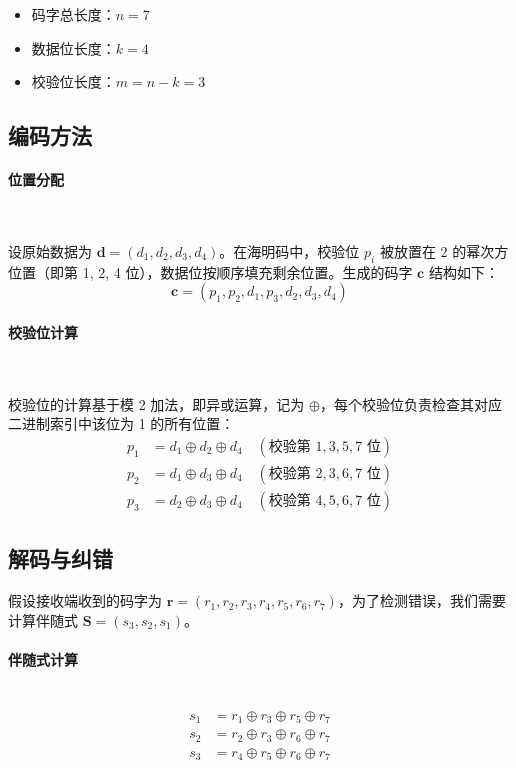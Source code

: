 \documentclass{article}
\begin{document}
\begin{itemize}
    \item 码字总长度：$n = 7$
    \item 数据位长度：$k = 4$
    \item 校验位长度：$m = n - k = 3$
\end{itemize}



\subsection{编码方法}
\paragraph*{位置分配}~{}

设原始数据为 $\mathbf{d} = (d_1, d_2, d_3, d_4)$。在海明码中，校验位 $p_i$ 被放置在 $2$ 的幂次方位置（即第 1, 2, 4 位），数据位按顺序填充剩余位置。生成的码字 $\mathbf{c}$ 结构如下：
\[ \mathbf{c} = (p_1, p_2, d_1, p_3, d_2, d_3, d_4) \]

\paragraph*{校验位计算}~{}

校验位的计算基于模 2 加法，即异或运算，记为 $\oplus$，每个校验位负责检查其对应二进制索引中该位为 1 的所有位置：
\begin{align*}
    p_1 &= d_1 \oplus d_2 \oplus d_4 \quad (\text{校验第 } 1, 3, 5, 7 \text{ 位}) \\
    p_2 &= d_1 \oplus d_3 \oplus d_4 \quad (\text{校验第 } 2, 3, 6, 7 \text{ 位}) \\
    p_3 &= d_2 \oplus d_3 \oplus d_4 \quad (\text{校验第 } 4, 5, 6, 7 \text{ 位})
\end{align*}



\subsection{解码与纠错}
假设接收端收到的码字为 $\mathbf{r} = (r_1, r_2, r_3, r_4, r_5, r_6, r_7)$，为了检测错误，我们需要计算伴随式 $\mathbf{S} = (s_3, s_2, s_1)$。

\paragraph*{伴随式计算}~{}
\begin{align*}
    s_1 &= r_1 \oplus r_3 \oplus r_5 \oplus r_7 \\
    s_2 &= r_2 \oplus r_3 \oplus r_6 \oplus r_7 \\
    s_3 &= r_4 \oplus r_5 \oplus r_6 \oplus r_7
\end{align*}
\end{document}
